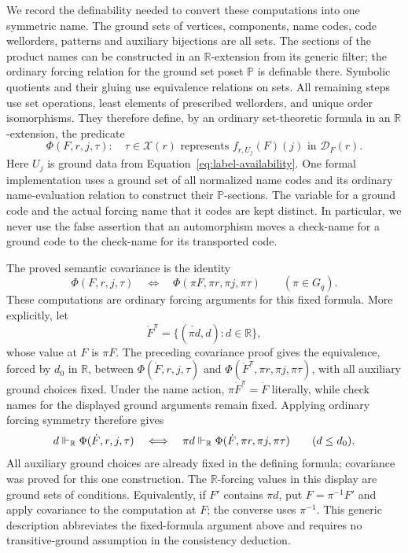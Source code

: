 We record the definability needed to convert these computations into
one symmetric name. The ground sets of vertices, components, name
codes, code wellorders, patterns and auxiliary bijections are all
sets. The sections of the product names can be constructed in an
$\mathbb R$-extension from its generic filter; the ordinary forcing
relation for the ground set poset $\mathbb P$ is definable there.
Symbolic quotients and their gluing use equivalence relations on sets.
All remaining steps use set operations, least elements of prescribed
wellorders, and unique order isomorphisms. They therefore define,
by an ordinary set-theoretic formula in an $\mathbb R$-extension, the
predicate
\begin{equation}\label{eq:assignment-predicate}
 \Phi(F,r,j,\tau):
 \quad \tau\in\mathcal X(r)\text{ represents }
 f_{r,U_j}(F)(j)\text{ in }\mathcal D_F(r).
\end{equation}
Here $U_j$ is ground data from Equation~\eqref{eq:label-availability}.
One formal implementation uses a ground set of all normalized name
codes and its ordinary name-evaluation relation to construct their
$\mathbb P$-sections. The variable for a ground code and the actual
forcing name that it codes are kept distinct. In particular, we never
use the false assertion that an automorphism moves a check-name for a
ground code to the check-name for its transported code.

The proved semantic covariance is the identity
\[
 \Phi(F,r,j,\tau)\quad\Longleftrightarrow\quad
 \Phi(\pi F,\pi r,\pi j,\pi\tau)
       \qquad(\pi\in G_q).
\]
These computations are ordinary forcing arguments for this fixed
formula. More explicitly, let
\[
 \dot F^{\pi}=
 \{(\check{\pi d},d):d\in\mathbb R\},
\]
whose value at $F$ is $\pi F$. The preceding covariance proof gives
the equivalence, forced by $d_0$ in $\mathbb R$, between
$\Phi(\dot F,r,j,\tau)$ and
$\Phi(\dot F^{\pi},\pi r,\pi j,\pi\tau)$, with all auxiliary
ground choices fixed. Under the name action,
$\pi\dot F^{\pi}=\dot F$ literally, while check names for the
displayed ground arguments remain fixed. Applying ordinary forcing
symmetry therefore gives
\begin{equation}\label{eq:assignment-forcing-covariance}
 d\Vdash_{\mathbb R}\Phi(\dot F,r,j,\tau)
 \quad\Longleftrightarrow\quad
 \pi d\Vdash_{\mathbb R}
                  \Phi(\dot F,\pi r,\pi j,\pi\tau)
 \qquad(d\le d_0).
\end{equation}
All auxiliary ground choices are already fixed in the defining
formula; covariance was proved for this one construction. The
$\mathbb R$-forcing values in this display are ground sets of
conditions. Equivalently, if $F'$ contains $\pi d$, put
$F=\pi^{-1}F'$ and apply covariance to the computation at $F$;
the converse uses $\pi^{-1}$. This generic description abbreviates
the fixed-formula argument above and requires no transitive-ground
assumption in the consistency deduction.


